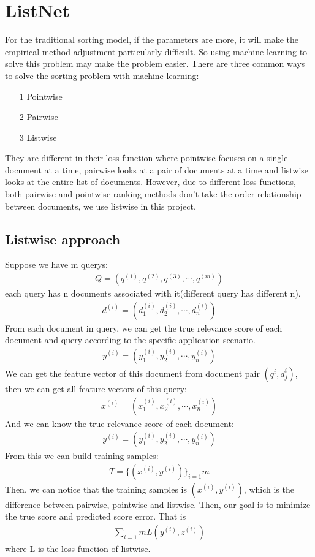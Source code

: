 \documentclass{acmtog} %
\begin{document}
\section{ListNet}
For the traditional sorting model, if the parameters are more, it will make the empirical method adjustment particularly difficult. So using machine learning to solve this problem may make the problem easier. There are three common ways to solve the sorting problem with machine learning:
    
\begin{enumerate}
    \item [1] Pointwise
    \item [2] Pairwise
    \item [3] Listwise
\end{enumerate}
They are different in their loss function where pointwise focuses on a single document at a time, pairwise looks at a pair of documents at a time and listwise looks at the entire list of documents. However, due to different loss functions, both pairwise and pointwise ranking methods don't take the order relationship between documents, we use listwise in this project.
\subsection{Listwise approach}
Suppose we have m querys:
\begin{eqnarray}
  Q=(q^{(1)}, q^{(2)},q^{(3)},\cdots,q^{(m)})
\end{eqnarray}
each query has n documents associated with it(different query has different n).
\begin{eqnarray}
  d^{(i)}=(d_1^{(i)},d_2^{(i)},\cdots,d_n^{(i)})
\end{eqnarray}
From each document in query, we can get the true relevance score of each document and query according to the specific application scenario.
\begin{eqnarray}
  y^{(i)}=(y_1^{(i)},y_2^{(i)},\cdots,y_n^{(i)})
\end{eqnarray}
We can get the feature vector of this document from document pair $(q^{i},d_j^{i})$, then we can get all feature vectors of this query:
\begin{eqnarray}
 x^{(i)}=(x_1^{(i)},x_2^{(i)},\cdots,x_n^{(i)})
\end{eqnarray}
And we can know the true relevance score of each document:
\begin{eqnarray}
  y^{(i)}=(y_1^{(i)},y_2^{(i)},\cdots,y_n^{(i)})
\end{eqnarray}
From this we can build training samples:
\begin{eqnarray}
  T=\{(x^{(i)},y^{(i)}) \}_{i=1}{m}
\end{eqnarray}
Then, we can notice that the training samples is $(x^{(i)},y^{(i)})$, which is the difference between pairwise, pointwise and listwise.
Then, our goal is to minimize the true score and predicted score error. That is 
\begin{eqnarray}
  \sum_{i=1}{m}L(y^{(i)},z^{(i)})
\end{eqnarray}
where L is the loss function of listwise.
\end{document}
